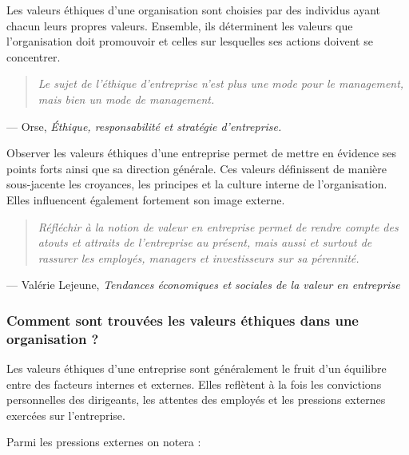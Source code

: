 \documentclass[12pt,a4paper]{report}
\begin{document}
Les valeurs éthiques d'une organisation sont choisies par des individus ayant chacun leurs propres valeurs. Ensemble, ils déterminent les valeurs que l'organisation doit promouvoir et celles sur lesquelles ses actions doivent se concentrer.

\begin{quote}
	\textit{Le sujet de l'éthique d'entreprise n'est plus une mode pour le management, mais bien un mode de management.}
\end{quote}
\hfill --- Orse, \textit{Éthique, responsabilité et stratégie d'entreprise.}

Observer les valeurs éthiques d'une entreprise permet de mettre en évidence ses points forts ainsi que sa direction générale. Ces valeurs définissent de manière sous-jacente les croyances, les principes et la culture interne de l'organisation. Elles influencent également fortement son image externe.

\begin{quote}
	\textit{Réfléchir à la notion de valeur en entreprise permet de rendre compte des atouts et attraits de l'entreprise au présent, mais aussi et surtout de rassurer les employés, managers et investisseurs sur sa pérennité.}
\end{quote}
\hfill --- Valérie Lejeune, \textit{Tendances économiques et sociales de la valeur en entreprise}

\subsubsection{Comment sont trouvées les valeurs éthiques dans une organisation ?}

Les valeurs éthiques d'une entreprise sont généralement le fruit d'un équilibre entre des facteurs internes et externes. Elles reflètent à la fois les convictions personnelles des dirigeants, les attentes des employés et les pressions externes exercées sur l'entreprise.

Parmi les pressions externes on notera :
\end{document}
